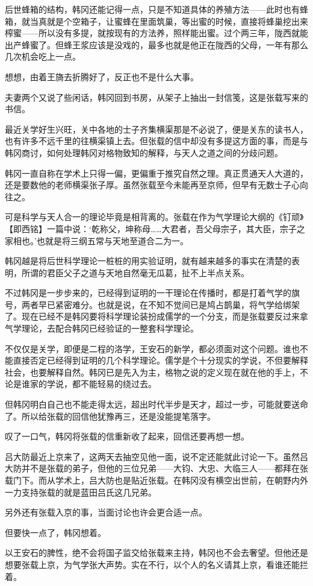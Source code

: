 后世蜂箱的结构，韩冈还能记得一点，只是不知道具体的养殖方法——此时也有蜂箱，就当真就是个空箱子，让蜜蜂在里面筑巢，等出蜜的时候，直接将蜂巢挖出来榨蜜——所以没有多提，就按现有的方法养，照样能出蜜。过个两三年，陇西就能出产蜂蜜了。但蜂王浆应该是没戏的，最多也就是他正在陇西的父母，一年有那么几次机会吃上一点。

想想，由着王旖去折腾好了，反正也不是什么大事。

夫妻两个又说了些闲话，韩冈回到书房，从架子上抽出一封信笺，这是张载写来的书信。

最近关学好生兴旺，关中各地的士子齐集横渠那是不必说了，便是关东的读书人，也有许多不远千里的往横渠镇上去。但张载的信中却没有多提这方面的事，而是与韩冈商讨，如何处理韩冈对格物致知的解释，与天人之道之间的分歧问题。

韩冈一直自称在学术上只得一偏，更偏重于推究自然之理。真正贯通天人大道的，还是要数他的老师横渠张子厚。虽然张载至今未能再至京师，但早有无数士子心向往之。

可是科学与天人合一的理论毕竟是相背离的。张载在作为气学理论大纲的《钉顽》【即西铭】一篇中说：‘乾称父，坤称母……大君者，吾父母宗子，其大臣，宗子之家相也。’也就是将三纲五常与天地至道合二为一。

韩冈越是将后世科学理论一桩桩的用实验证明，就有越来越多的事实在清楚的表明，所谓的君臣父子之道与天地自然毫无瓜葛，扯不上半点关系。

不过韩冈是一步步来的，已经得到证明的一干理论在传播时，都是打着气学的旗号，两者早已紧密难分。也就是说，在不知不觉间已是鸠占鹊巢，将气学给绑架了。现在已经不是韩冈要将科学理论装扮成儒学的一个分支，而是张载要反过来拿气学理论，去配合韩冈已经验证的一整套科学理论。

不仅仅是关学，即便是二程的洛学，王安石的新学，都必须面对这个问题。谁也不能直接否定已经得到证明的几个科学理论。儒学是个十分现实的学说，不但要解释社会，也要解释自然。韩冈已是先入为主，格物之说的定义现在就在他的手上，不论是谁家的学说，都不能轻易的绕过去。

但韩冈明白自己也不能走得太远，超出时代半步是天才，超过一步，可能就要送命了。所以给张载的回信他犹豫再三，还是没能提笔落字。

叹了一口气，韩冈将张载的信重新收了起来，回信还要再想一想。

吕大防最近上京来了，这两天去抽空见他一面，说不定还能就此讨论一下。虽然吕大防并不是张载的弟子，但他的三位兄弟——大钧、大忠、大临三人——都拜在张载门下。而从学术上，吕大防也是贴近张载。在韩冈没有横空出世前，在朝野内外一力支持张载的就是蓝田吕氏这几兄弟。

另外还有张载入京的事，当面讨论也许会更合适一点。

但要快一点了，韩冈想着。

以王安石的脾性，绝不会将国子监交给张载来主持，韩冈也不会去奢望。但他还是想要张载上京，为气学张大声势。实在不行，以个人的名义请其上京，看谁还能拦着。


